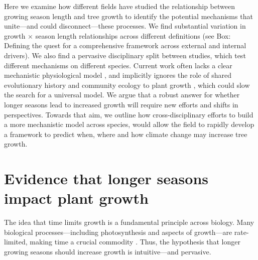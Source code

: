 \documentclass[11pt]{article}
\newcommand{\R}[1]{\label{#1}\linelabel{#1}}
\begin{document}
Here we examine how different fields have studied the relationship between growing season length and tree growth to identify the potential mechanisms that unite---and could disconnect---these processes. %
We find substantial variation in growth $\times$ season length relationships across different definitions (see Box: Defining the quest for a comprehensive framework across external and internal drivers). We also find a pervasive disciplinary split between studies, which test different mechanisms on different species. \R{fornccS}Current work often lacks a clear mechanistic physiological model \citep{korner2015paradigm,fatichi2019modelling}, and implicitly ignores the role of shared evolutionary history and community ecology to plant growth \citep[e.g.][]{Grime:1977sw,Webb:2002or,avila2023evidence}, which could slow the search for a universal model. We argue that a robust answer for whether longer seasons lead to increased growth will require new efforts and shifts in perspectives. Towards that aim, we outline how cross-disciplinary efforts to build a more mechanistic model across species, would allow the field to rapidly develop a framework to predict when, where and how climate change may increase tree growth.\R{fornccE} %

\section*{Evidence that longer seasons impact plant growth} %
The idea that time limits growth is a fundamental principle across biology. Many biological processes---including photosynthesis and aspects of growth---are rate-limited, making time a crucial commodity \citep{nobel1983biophysical,cosgrove2005growth,hilty2021plant}. Thus, the hypothesis that longer growing seasons should increase growth is intuitive---and pervasive. 
\end{document}

